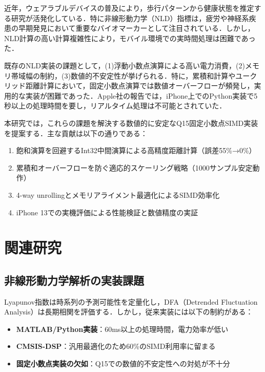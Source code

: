 \documentclass[paper]{ieice}
\begin{document}
近年，ウェアラブルデバイスの普及により，歩行パターンから健康状態を推定する研究が活発化している\cite{hausdorff2009}．特に非線形動力学（NLD）指標は，疲労や神経系疾患の早期発見において重要なバイオマーカーとして注目されている\cite{peng1995}．しかし，NLD計算の高い計算複雑性により，モバイル環境での実時間処理は困難であった．

既存のNLD実装の課題として，(1)浮動小数点演算による高い電力消費，(2)メモリ帯域幅の制約，(3)数値的不安定性が挙げられる．特に，累積和計算やユークリッド距離計算において，固定小数点演算では数値オーバーフローが頻発し，実用的な実装が困難であった．Apple社の報告\cite{apple2021}では，iPhone上でのPython実装で5秒以上の処理時間を要し，リアルタイム処理は不可能とされていた．

本研究では，これらの課題を解決する数値的に安定なQ15固定小数点SIMD実装を提案する．主な貢献は以下の通りである：

\begin{enumerate}
\item 飽和演算を回避するInt32中間演算による高精度距離計算（誤差55\%→0\%）
\item 累積和オーバーフローを防ぐ適応的スケーリング戦略（1000サンプル安定動作）
\item 4-way unrollingとメモリアライメント最適化によるSIMD効率化
\item iPhone 13での実機評価による性能検証と数値精度の実証
\end{enumerate}

\section{関連研究}

\subsection{非線形動力学解析の実装課題}

Lyapunov指数\cite{rosenstein1993}は時系列の予測可能性を定量化し，DFA（Detrended Fluctuation Analysis）\cite{peng1994}は長期相関を評価する．しかし，従来実装には以下の制約がある：

\begin{itemize}
\item \textbf{MATLAB/Python実装}：60ms以上の処理時間，電力効率が低い
\item \textbf{CMSIS-DSP}\cite{arm2020}：汎用最適化のため60\%のSIMD利用率に留まる
\item \textbf{固定小数点実装の欠如}：Q15での数値的不安定性への対処が不十分
\end{itemize}
\end{document}
